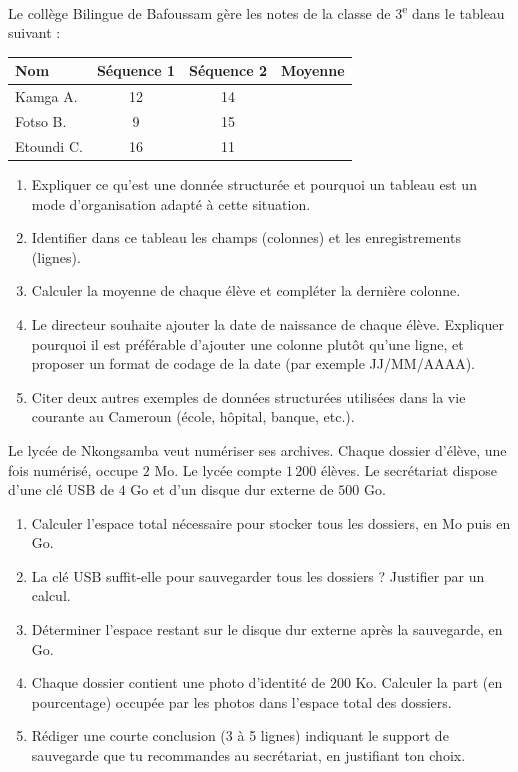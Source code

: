 \documentclass[11pt]{article}
\begin{document}
\begin{exercice}
Le collège Bilingue de Bafoussam gère les notes de la classe de 3\textsuperscript{e} dans le tableau suivant :

\begin{center}
\begin{tabular}{|l|c|c|c|}
\hline
\textbf{Nom} & \textbf{Séquence 1} & \textbf{Séquence 2} & \textbf{Moyenne} \\
\hline
Kamga A. & 12 & 14 & \\
\hline
Fotso B. & 9 & 15 & \\
\hline
Etoundi C. & 16 & 11 & \\
\hline
\end{tabular}
\end{center}

\begin{enumerate}
\item Expliquer ce qu'est une donnée structurée et pourquoi un tableau est un mode d'organisation adapté à cette situation.
\item Identifier dans ce tableau les champs (colonnes) et les enregistrements (lignes).
\item Calculer la moyenne de chaque élève et compléter la dernière colonne.
\item Le directeur souhaite ajouter la date de naissance de chaque élève. Expliquer pourquoi il est préférable d'ajouter une colonne plutôt qu'une ligne, et proposer un format de codage de la date (par exemple JJ/MM/AAAA).
\item Citer deux autres exemples de données structurées utilisées dans la vie courante au Cameroun (école, hôpital, banque, etc.).
\end{enumerate}
\end{exercice}

\begin{exercice}
Le lycée de Nkongsamba veut numériser ses archives. Chaque dossier d'élève, une fois numérisé, occupe $2$ Mo. Le lycée compte $1\,200$ élèves. Le secrétariat dispose d'une clé USB de $4$ Go et d'un disque dur externe de $500$ Go.
\begin{enumerate}
\item Calculer l'espace total nécessaire pour stocker tous les dossiers, en Mo puis en Go.
\item La clé USB suffit-elle pour sauvegarder tous les dossiers ? Justifier par un calcul.
\item Déterminer l'espace restant sur le disque dur externe après la sauvegarde, en Go.
\item Chaque dossier contient une photo d'identité de $200$ Ko. Calculer la part (en pourcentage) occupée par les photos dans l'espace total des dossiers.
\item Rédiger une courte conclusion (3 à 5 lignes) indiquant le support de sauvegarde que tu recommandes au secrétariat, en justifiant ton choix.
\end{enumerate}
\end{exercice}
\end{document}
